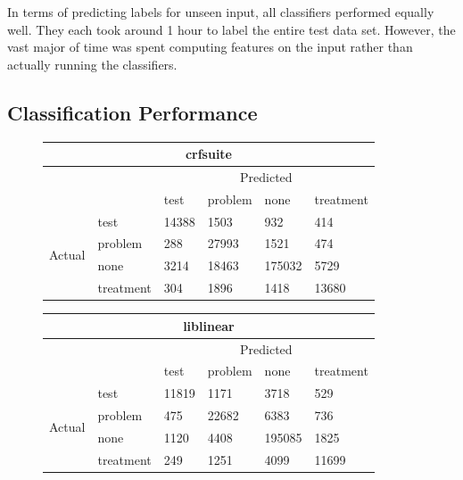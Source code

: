 \documentclass[preprint]{style}
\begin{document}
In terms of predicting labels for unseen input, all classifiers performed equally well. They each took around 1 hour to label the entire test data set. However, the vast major of time was spent computing features on the input rather than actually running the classifiers.

\subsection{Classification Performance}

\begin{figure}[t]
\begin{center}
	\begin{tabular}{|l|l|l|l|l|l|}
	\hline
	\multicolumn{6}{|c|}{\bf crfsuite} \\ \hline
	& & \multicolumn{4}{|c|}{Predicted} \\ \cline{2-6}
	& & test & problem & none & treatment \\ \cline{2-6}
	\multirow{4}{*}{\begin{sideways}Actual\end{sideways}}
		& test & 14388 & 1503 & 932 & 414	\\ \cline{2-6}
		& problem & 288 & 27993 & 1521 & 474	\\ \cline{2-6}
		& none & 3214 & 18463 & 175032 & 5729	\\ \cline{2-6}
		& treatment & 304 & 1896 & 1418 & 13680	\\ \hline

	\end{tabular}
\end{center}

\begin{center}
	\begin{tabular}{|l|l|l|l|l|l|}
	\hline
	\multicolumn{6}{|c|}{\bf liblinear} \\ \hline
	& & \multicolumn{4}{|c|}{Predicted} \\ \cline{2-6}
	& & test & problem & none & treatment \\ \cline{2-6}
	\multirow{4}{*}{\begin{sideways}Actual\end{sideways}}
		& test & 11819 & 1171 & 3718 & 529	\\ \cline{2-6}
		& problem & 475 & 22682 & 6383 & 736	\\ \cline{2-6}
		& none & 1120 & 4408 & 195085 & 1825	\\ \cline{2-6}
		& treatment & 249 & 1251 & 4099 & 11699	\\ \hline


\end{tabular}
\end{center}
\end{figure}
\end{document}
